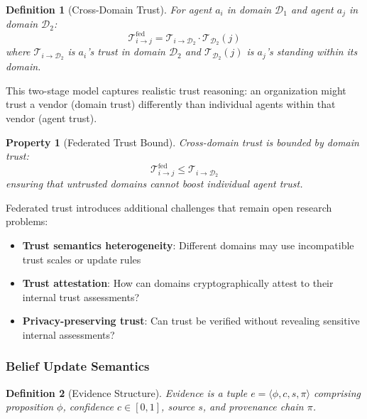 \documentclass[
]{article}
\newtheorem{definition}{Definition}[section]
\newtheorem{property}{Property}[section]
\begin{document}
\begin{definition}[Cross-Domain Trust]
\label{def:cross-domain-trust}
For agent $a_i$ in domain $\mathcal{D}_1$ and agent $a_j$ in domain $\mathcal{D}_2$:
\begin{equation}
\label{eq:cross-domain-trust}
\mathcal{T}_{i \to j}^{\text{fed}} = \mathcal{T}_{i \to \mathcal{D}_2} \cdot \mathcal{T}_{\mathcal{D}_2}(j)
\end{equation}
where $\mathcal{T}_{i \to \mathcal{D}_2}$ is $a_i$'s trust in domain $\mathcal{D}_2$ and $\mathcal{T}_{\mathcal{D}_2}(j)$ is $a_j$'s standing within its domain.
\end{definition}

This two-stage model captures realistic trust reasoning: an organization
might trust a vendor (domain trust) differently than individual agents
within that vendor (agent trust).

\begin{property}[Federated Trust Bound]
\label{prop:federated-bound}
Cross-domain trust is bounded by domain trust:
\begin{equation}
\label{eq:federated-bound}
\mathcal{T}_{i \to j}^{\text{fed}} \leq \mathcal{T}_{i \to \mathcal{D}_2}
\end{equation}
ensuring that untrusted domains cannot boost individual agent trust.
\end{property}

Federated trust introduces additional challenges that remain open
research problems:

\begin{itemize}
\item \textbf{Trust semantics heterogeneity}: Different domains may use incompatible trust scales or update rules
\item \textbf{Trust attestation}: How can domains cryptographically attest to their internal trust assessments?
\item \textbf{Privacy-preserving trust}: Can trust be verified without revealing sensitive internal assessments?
\end{itemize}

\subsubsection{Belief Update Semantics}\label{sec:belief-update-rules}

\begin{definition}[Evidence Structure]
\label{def:evidence}
Evidence is a tuple $e = \langle \phi, c, s, \pi \rangle$ comprising proposition $\phi$, confidence $c \in [0,1]$, source $s$, and provenance chain $\pi$.
\end{definition}
\end{document}
